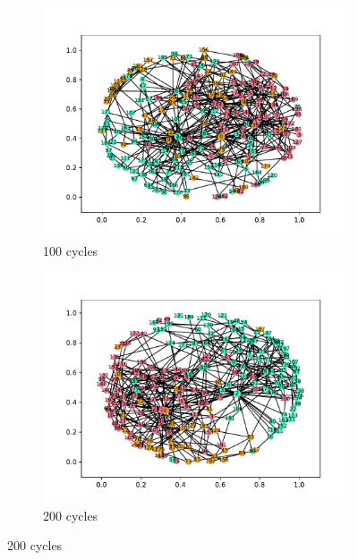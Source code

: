 \begin{figure}
  \centering
  \begin{subfigure}[t]{.45\textwidth}
    \centering
    \includegraphics[trim={1cm .5cm 1cm 1cm}, clip, width=\linewidth]{img/pdf/plot-0100.pdf} 
    \caption{100 cycles}
    \label{fig:100}
  \end{subfigure}
  \begin{subfigure}[t]{.45\textwidth}
    \centering
    \includegraphics[trim={1cm .5cm 1cm 1cm}, clip, width=\linewidth]{img/pdf/plot-0200.pdf} 
    \caption{200 cycles}
    \label{fig:200}
  \end{subfigure}

  \vspace{0cm}


\end{figure}
